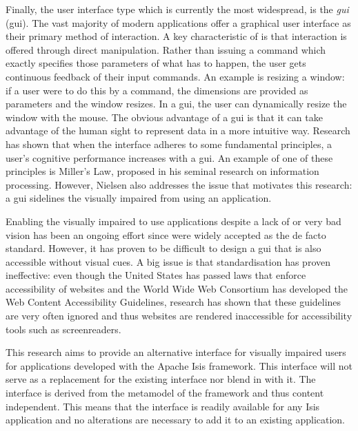 Finally, the user interface type which is currently the most widespread, is the \textit{\acrlong{gui}} (\acrshort{gui}). The vast majority of modern applications offer a graphical user interface as their primary method of interaction. A key characteristic of  is that interaction is offered through direct manipulation. Rather than issuing a command which exactly specifies those parameters of what has to happen, the user gets continuous feedback of their input commands. An example is resizing a window: if a user were to do this by a command, the dimensions are provided as parameters and the window resizes. In a \acrshort{gui}, the user can dynamically resize the window with the mouse. The obvious advantage of a \acrshort{gui} is that it can take advantage of the human sight to represent data in a more intuitive way. Research has shown that when the interface adheres to some fundamental principles, a user's cognitive performance increases with a \acrshort{gui}. An example of one of these principles is Miller's Law, proposed in his seminal research on information processing\cite{miller1956magical}. However, Nielsen also addresses the issue that motivates this research: a \acrshort{gui} sidelines the visually impaired from using an application.

Enabling the visually impaired to use applications despite a lack of or very bad vision has been an ongoing effort since  were widely accepted as the de facto standard\cite{boyd1990graphical}. However, it has proven to be difficult to design a \acrshort{gui} that is also accessible without visual cues. A big issue is that standardisation has proven ineffective: even though the United States has passed laws that enforce accessibility of websites\cite{Secti81:online} and the World Wide Web Consortium has developed the Web Content Accessibility Guidelines\cite{WebCo83:online}, research has shown that these guidelines are very often ignored and thus websites are rendered inaccessible for accessibility tools such as screenreaders\cite{leuthold2008beyond}.

This research aims to provide an alternative interface for visually impaired users for applications developed with the Apache Isis\cite{Apach60:online} framework. This interface will not serve as a replacement for the existing interface nor blend in with it. The interface is derived from the metamodel of the framework and thus content independent. This means that the interface is readily available for any Isis application and no alterations are necessary to add it to an existing application.

